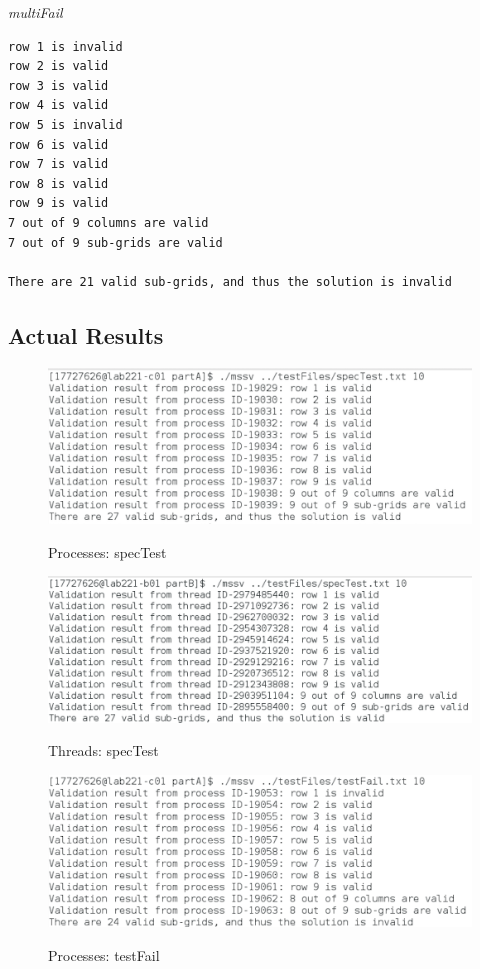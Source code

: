 \documentclass[]{article}
\begin{document}
\vspace{1cm}
\textit{multiFail}
\begin{lstlisting}[style=code]
row 1 is invalid
row 2 is valid
row 3 is valid
row 4 is valid
row 5 is invalid
row 6 is valid
row 7 is valid
row 8 is valid
row 9 is valid
7 out of 9 columns are valid
7 out of 9 sub-grids are valid

There are 21 valid sub-grids, and thus the solution is invalid
\end{lstlisting}
\subsection{Actual Results}


	\begin{figure}[H]
	\caption{Processes: specTest}
	\begin{center}
		{
			\includegraphics[height=0.25\textheight,width=1.0
			\textwidth]{Pro_spec.png}}
	\end{center}
	\end{figure}
	
	
	\begin{figure}[H]
	\caption{Threads: specTest}		
		\begin{center}
			{
				\includegraphics[height=0.25\textheight,width=1.0
				\textwidth]{Thr_spec.png}}
		\end{center}
	\end{figure}

	\begin{figure}[H]
	\caption{Processes: testFail}
	\begin{center}
		{
			\includegraphics[height=0.25\textheight,width=1.0
			\textwidth]{Pro_testF.png}}
	\end{center}
	\end{figure}
\end{document}
